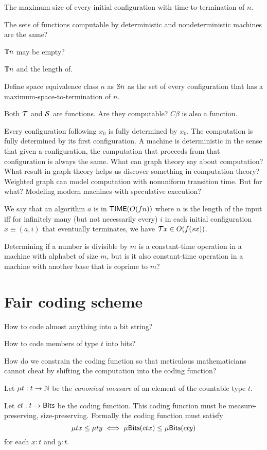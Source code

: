 The maximum size of every initial configuration with time-to-termination of $n$.

The sets of functions computable by deterministic and nondeterministic machines are the same?

$\mathbb{T} n$ may be empty?

$\mathbb{T} n$ and the length of.

Define space equivalence class $n$ as $\mathbb{S} n$ as the set of
every configuration that has a maximum-space-to-termination of $n$.

Both $\mathcal{T}$ and $\mathcal{S}$ are functions.
Are they computable?
$C \beta$ is also a function.

Every configuration following $x_0$ is fully determined by $x_0$.
The computation is fully determined by its first configuration.
A machine is deterministic in the sense that given a configuration,
the computation that proceeds from that configuration is always the same.
What can graph theory say about computation?
What result in graph theory helps us discover something in computation theory?
Weighted graph can model computation with nonuniform transition time.
But for what?
Modeling modern machines with speculative execution?

We say that an algorithm $a$ is in $\operatorname{\mathsf{TIME}}(O(f n))$ where $n$ is the length of the input iff
for infinitely many (but not necessarily every) $i$ in each initial configuration
$x \equiv (a,i)$ that eventually terminates, we have $\mathcal{T} x \in O(f(s x))$.

Determining if a number is divisible by $m$ is a constant-time operation in a machine with alphabet of size $m$,
but is it also constant-time operation in a machine with another base that is coprime to $m$?

\section{Fair coding scheme}

How to code almost anything into a bit string?

How to code members of type $t$ into bits?

How do we constrain the coding function so that meticulous mathematicians
cannot cheat by shifting the computation into the coding function?

Let $\mu t : t \to \mathbb{N}$ be the \emph{canonical measure} of an element of the countable type $t$.

Let $c t : t \to \textsf{Bits}$ be the coding function.
This coding function must be measure-preserving, size-preserving.
Formally the coding function must satisfy
\[
    \mu t x \le \mu t y \iff \mu \textsf{Bits} (c t x) \le \mu \textsf{Bits} (c t y)
\]
for each $x : t$ and $y : t$.

